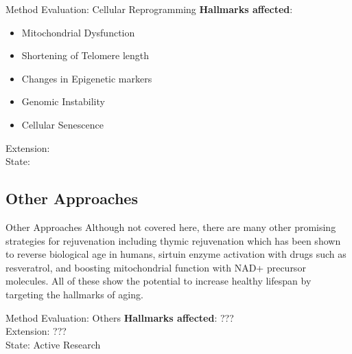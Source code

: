 \begin{frame}[c]{Method Evaluation: Cellular Reprogramming}
    \textbf{Hallmarks affected}: \\
    \begin{itemize}[<(1)->]
        \item Mitochondrial Dysfunction
        \item Shortening of Telomere length
        \item Changes in Epigenetic markers
        \item Genomic Instability
        \item Cellular Senescence
    \end{itemize}
    \pause
    Extension: \\
    \pause
    State:
\end{frame}



\subsection{Other Approaches}

\begin{frame}[c]{Other Approaches}
    Although not covered here, there are many other promising strategies for rejuvenation including thymic rejuvenation which has been shown to reverse biological age in humans, sirtuin enzyme activation with drugs such as resveratrol, and boosting mitochondrial function with NAD+ precursor molecules. All of these show the potential to increase healthy lifespan by targeting the hallmarks of aging.
\end{frame}


\begin{frame}[c]{Method Evaluation: Others}
    \textbf{Hallmarks affected}: ??? \\
    \pause
    Extension: ??? \\
    \pause
    State: Active Research
\end{frame}


